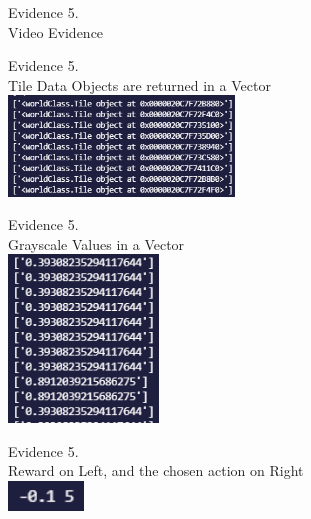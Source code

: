 \begin{flushleft}
\begin{center}
        {\large Evidence 5.\rn } \\ 
        \vspace{0.3cm}
        Video Evidence
        \vspace{1cm}

        {\large Evidence 5.\rn } \\ 
        \vspace{0.3cm}
        Tile Data Objects are returned in a Vector \\
        \includegraphics[width=6cm]{Images/Testing/T5.4.1.PNG} \\
        \vspace{1cm}

        {\large Evidence 5.\rn } \\ 
        \vspace{0.3cm}
        Grayscale Values in a Vector \\
        \includegraphics[width=4cm]{Images/Testing/T5.5.1.PNG} \\
        \vspace{1cm}

        {\large Evidence 5.\rn } \\ 
        \vspace{0.3cm}
        Reward on Left, and the chosen action on Right \\
        \includegraphics[width=2cm]{Images/Testing/T5.6.1.PNG} \\
        \vspace{1cm}


\end{center}
\end{flushleft}
